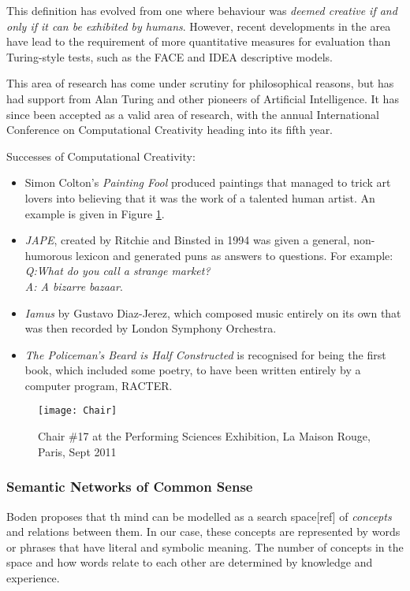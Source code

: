 This definition has evolved from one where behaviour was \textit{deemed creative if and only if it can be exhibited by humans}\cite{wiggins2006searching}. However, recent developments in the area have lead to the requirement of more quantitative measures for evaluation than Turing-style tests, such as the FACE and IDEA descriptive models\cite{colton2011computational}.

This area of research has come under scrutiny for philosophical reasons, but has had support from Alan Turing and other pioneers of Artificial Intelligence. It has since been accepted as a valid area of research, with the annual International Conference on Computational Creativity heading into its fifth year.

Successes of Computational Creativity:
\begin{itemize}
\item{Simon Colton's \textit{Painting Fool}\cite{colton2012painting} produced paintings that managed to trick art lovers into believing that it was the work of a talented human artist. An example is given in Figure \ref{fig:chair}.}
\item{\textit{JAPE}\cite{binsted1997computational}, created by Ritchie and Binsted in 1994 was given a general, non-humorous lexicon and generated puns as answers to questions. For example:\\\textit{Q:What do you call a strange market?\\ A: A bizarre bazaar}.}
\item{\textit{Iamus} by Gustavo Diaz-Jerez\cite{diaz2011composing}, which composed music entirely on its own that was then recorded by London Symphony Orchestra.}
\item{\textit{The Policeman's Beard is Half Constructed}\cite{chamberlain1984policeman} is recognised for being the first book, which included some poetry, to have been written entirely by a computer program, RACTER.}
\end{itemize} 

\begin{figure}[h!]
\centering
\texttt{[image: Chair]}
\caption{Chair \#17 at the Performing Sciences Exhibition, La Maison Rouge, Paris, Sept 2011}
\label{fig:chair}
\end{figure}

\subsubsection{Semantic Networks of Common Sense}
\label{sec:common-sense-bg}
Boden proposes that th mind can be modelled as a search space[ref] of \textit{concepts} and relations between them. In our case, these concepts are represented by words or phrases that have literal and symbolic meaning. The number of concepts in the space and how words relate to each other are determined by knowledge and experience.

